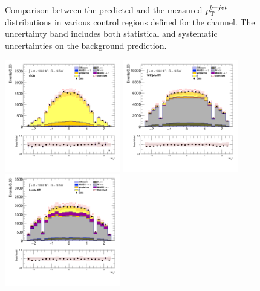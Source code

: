 \begin{figure}[!htp]
\begin{center}
			\end{center}
			\caption{
			Comparison between the predicted and the measured $p_{\text{T}}^{b-jet}$ distributions in various control regions defined for the \taujets channel. The uncertainty band includes both statistical and systematic uncertainties on the background prediction. 
			}
			\label{fig:bkg-bjet-pt-taujets}
		\end{figure}

		\begin{figure}[!htp]
			\begin{center}    
			\includegraphics[width=0.45\textwidth]{chapters/chapter6_HPlus/images/taujets/tau_0_eta_TTBAR.png}
			\includegraphics[width=0.45\textwidth]{chapters/chapter6_HPlus/images/taujets/tau_0_eta_WJETS.png} \\
			\includegraphics[width=0.45\textwidth]{chapters/chapter6_HPlus/images/taujets/tau_0_eta_BVETO.png}

\end{center}
\end{figure}
